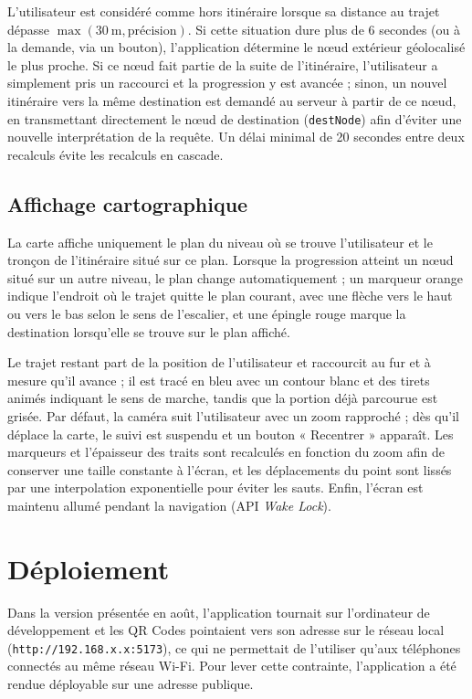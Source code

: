 \documentclass[12pt,a4paper]{report}
\begin{document}
L'utilisateur est considéré comme hors itinéraire lorsque sa distance au trajet dépasse
$\max(30~\text{m}, \text{précision})$. Si cette situation dure plus de 6 secondes (ou à la demande,
via un bouton), l'application détermine le nœud extérieur géolocalisé le plus proche. Si ce nœud
fait partie de la suite de l'itinéraire, l'utilisateur a simplement pris un raccourci et la
progression y est avancée ; sinon, un nouvel itinéraire vers la même destination est demandé au
serveur à partir de ce nœud, en transmettant directement le nœud de destination
(\texttt{destNode}) afin d'éviter une nouvelle interprétation de la requête. Un délai minimal de
20 secondes entre deux recalculs évite les recalculs en cascade.

\subsection{Affichage cartographique}

La carte affiche uniquement le plan du niveau où se trouve l'utilisateur et le tronçon de
l'itinéraire situé sur ce plan. Lorsque la progression atteint un nœud situé sur un autre niveau,
le plan change automatiquement ; un marqueur orange indique l'endroit où le trajet quitte le plan
courant, avec une flèche vers le haut ou vers le bas selon le sens de l'escalier, et une épingle
rouge marque la destination lorsqu'elle se trouve sur le plan affiché.

Le trajet restant part de la position de l'utilisateur et raccourcit au fur et à mesure qu'il
avance ; il est tracé en bleu avec un contour blanc et des tirets animés indiquant le sens de
marche, tandis que la portion déjà parcourue est grisée. Par défaut, la caméra suit l'utilisateur
avec un zoom rapproché ; dès qu'il déplace la carte, le suivi est suspendu et un bouton
« Recentrer » apparaît. Les marqueurs et l'épaisseur des traits sont recalculés en fonction du zoom
afin de conserver une taille constante à l'écran, et les déplacements du point sont lissés par une
interpolation exponentielle pour éviter les sauts. Enfin, l'écran est maintenu allumé pendant la
navigation (API \emph{Wake Lock}).

\section{Déploiement}

Dans la version présentée en août, l'application tournait sur l'ordinateur de développement et
les QR Codes pointaient vers son adresse sur le réseau local (\texttt{http://192.168.x.x:5173}),
ce qui ne permettait de l'utiliser qu'aux téléphones connectés au même réseau Wi-Fi. Pour lever
cette contrainte, l'application a été rendue déployable sur une adresse publique.
\end{document}
